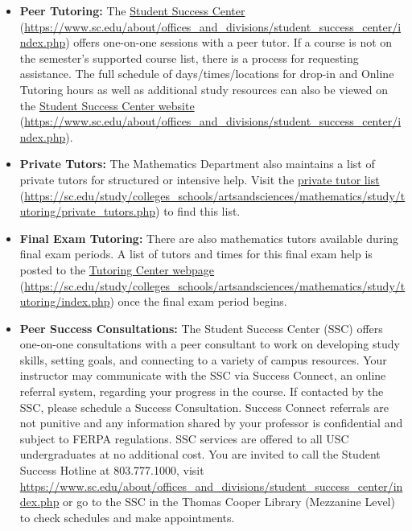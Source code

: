 \documentclass[11pt,letterpaper]{article}
\begin{document}
\begin{itemize}
	\item {\bfseries Peer Tutoring:} The \href{https://www.sc.edu/about/offices\_and\_divisions/student\_success\_center/index.php}{Student Success Center} (\url{https://www.sc.edu/about/offices\_and\_divisions/student\_success\_center/index.php}) offers one-on-one sessions with a peer tutor.  If a course is not on the semester's supported course list, there is a process for requesting assistance. The full schedule of days/times/locations for drop-in and Online Tutoring hours as well as additional study resources can also be viewed on the \href{https://www.sc.edu/about/offices\_and\_divisions/student\_success\_center/index.php}{Student Success Center website} (\url{https://www.sc.edu/about/offices\_and\_divisions/student\_success\_center/index.php}).
	
	\item {\bfseries Private Tutors:} The Mathematics Department also maintains a list of private tutors for structured or intensive help. Visit the \href{https://sc.edu/study/colleges\_schools/artsandsciences/mathematics/study/tutoring/private\_tutors.php}{private tutor list} (\url{https://sc.edu/study/colleges\_schools/artsandsciences/mathematics/study/tutoring/private\_tutors.php}) to find this list. 
	
	\item {\bfseries Final Exam Tutoring:} There are also mathematics tutors available during final exam periods. A list of tutors and times for this final exam help is posted to the \href{https://sc.edu/study/colleges\_schools/artsandsciences/mathematics/study/tutoring/index.php}{Tutoring Center webpage} (\url{https://sc.edu/study/colleges\_schools/artsandsciences/mathematics/study/tutoring/index.php}) once the final exam period begins. 
	
	\item {\bfseries Peer Success Consultations:} The Student Success Center (SSC) offers one-on-one consultations with a peer consultant to work on developing study skills, setting goals, and connecting to a variety of campus resources. Your instructor may communicate with the SSC via Success Connect, an online referral system, regarding your progress in the course. If contacted by the SSC, please schedule a Success Consultation. Success Connect referrals are not punitive and any information shared by your professor is confidential and subject to FERPA regulations. SSC services are offered to all USC undergraduates at no additional cost. You are invited to call the Student Success Hotline at 803.777.1000, visit \url{https://www.sc.edu/about/offices\_and\_divisions/student\_success\_center/index.php} or go to the SSC in the Thomas Cooper Library (Mezzanine Level) to check schedules and make appointments.
	\end{itemize} \pspace
\end{document}
